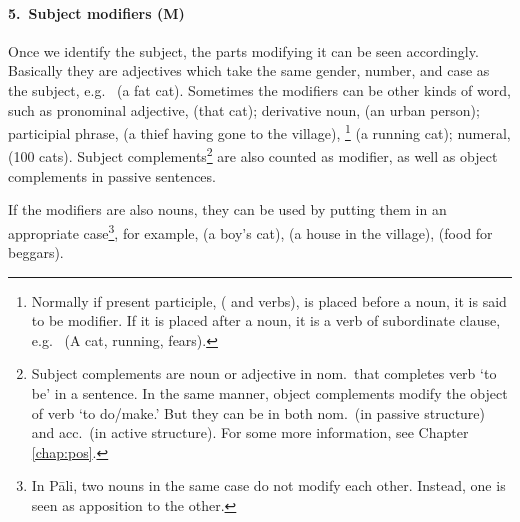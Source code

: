 \paragraph*{5.\ Subject modifiers (\textbf{M})} Once we identify the subject, the parts modifying it can be seen accordingly. Basically they are adjectives which take the same gender, number, and case as the subject, e.g.\  (a fat cat). Sometimes the modifiers can be other kinds of word, such as pronominal adjective,  (that cat); derivative noun,  (an urban person); participial phrase,  (a thief having gone to the village), \footnote{Normally if present participle, ( and  verbs), is placed before a noun, it is said to be modifier. If it is placed after a noun, it is a verb of subordinate clause, e.g.\  (A cat, running, fears).} (a running cat); numeral,  (100 cats). Subject complements\footnote{Subject complements are noun or adjective in nom.\ that completes verb `to be' in a sentence. In the same manner, object complements modify the object of verb `to do/make.' But they can be in both nom.\ (in passive structure) and acc.\ (in active structure). For some more information, see Chapter \ref{chap:pos}.} are also counted as modifier, as well as object complements in passive sentences.

If the modifiers are also nouns, they can be used by putting them in an appropriate case\footnote{In P\=ali, two nouns in the same case do not modify each other. Instead, one is seen as apposition to the other.}, for example,  (a boy's cat),  (a house in the village),  (food for beggars).

